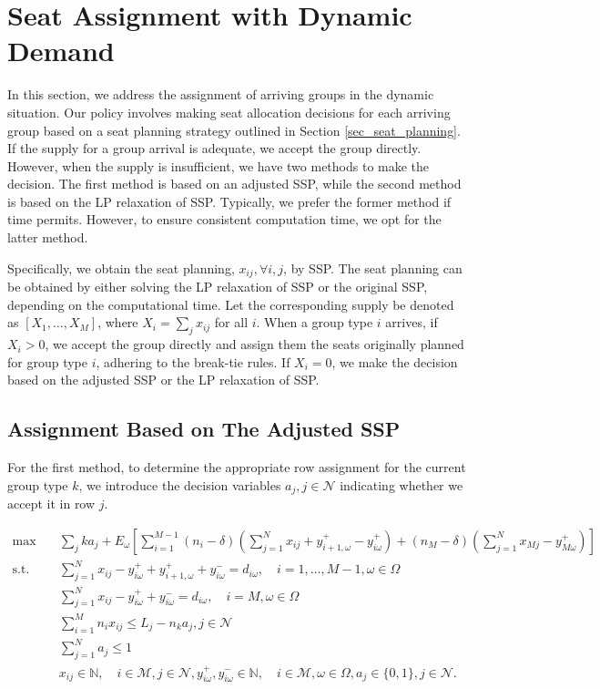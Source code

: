 \section{Seat Assignment with Dynamic Demand}\label{sec_dynamic}

In this section, we address the assignment of arriving groups in the dynamic situation. Our policy involves making seat allocation decisions for each arriving group based on a seat planning strategy outlined in Section \ref{sec_seat_planning}. If the supply for a group arrival is adequate, we accept the group directly. However, when the supply is insufficient, we have two methods to make the decision. The first method is based on an adjusted SSP, while the second method is based on the LP relaxation of SSP. Typically, we prefer the former method if time permits. However, to ensure consistent computation time, we opt for the latter method.


Specifically, we obtain the seat planning, $x_{ij}, \forall i,j$, by SSP. The seat planning can be obtained by either solving the LP relaxation of SSP or the original SSP, depending on the computational time. Let the corresponding supply be denoted as $[X_1, \ldots, X_M]$, where $X_i = \sum_{j} x_{ij}$ for all $i$. When a group type $i$ arrives, if $X_i > 0$, we accept the group directly and assign them the seats originally planned for group type $i$, adhering to the break-tie rules. If $X_i = 0$, we make the decision based on the adjusted SSP or the LP relaxation of SSP.

\subsection{Assignment Based on The Adjusted SSP}

For the first method, to determine the appropriate row assignment for the current group type $k$, we introduce the decision variables $a_j, j \in \mathcal{N}$ indicating whether we accept it in row $j$.

\begin{equation}\label{adjusted_SSP}
  \begin{aligned}
  \max \quad & \sum_{j} k a_j + E_{\omega}\left[\sum_{i=1}^{M-1} (n_i-\delta) (\sum_{j= 1}^{N} x_{ij} + y_{i+1,\omega}^{+} - y_{i \omega}^{+}) + (n_{M}-\delta) (\sum_{j= 1}^{N} x_{Mj} - y_{M \omega}^{+})\right] \\
  \text {s.t.} \quad & \sum_{j= 1}^{N} x_{ij}-y_{i \omega}^{+}+
  y_{i+1, \omega}^{+} + y_{i \omega}^{-}=d_{i \omega}, \quad i = 1,\ldots,M-1, \omega \in \Omega \\
  & \sum_{j= 1}^{N} x_{ij} -y_{i \omega}^{+}+y_{i \omega}^{-}=d_{i \omega}, \quad i = M, \omega \in \Omega \\
  & \sum_{i=1}^{M} n_{i} x_{ij} \leq L_j - n_k a_j, j \in \mathcal{N} \\
  & \sum_{j=1}^{N} a_j \leq 1 \\
  & x_{ij} \in \mathbb{N}, \quad i \in \mathcal{M}, j \in \mathcal{N}, y_{i \omega}^{+}, y_{i \omega}^{-} \in \mathbb{N}, \quad i \in \mathcal{M}, \omega \in \Omega,  a_j \in \{0,1\}, j \in \mathcal{N}.
  \end{aligned}
\end{equation}

